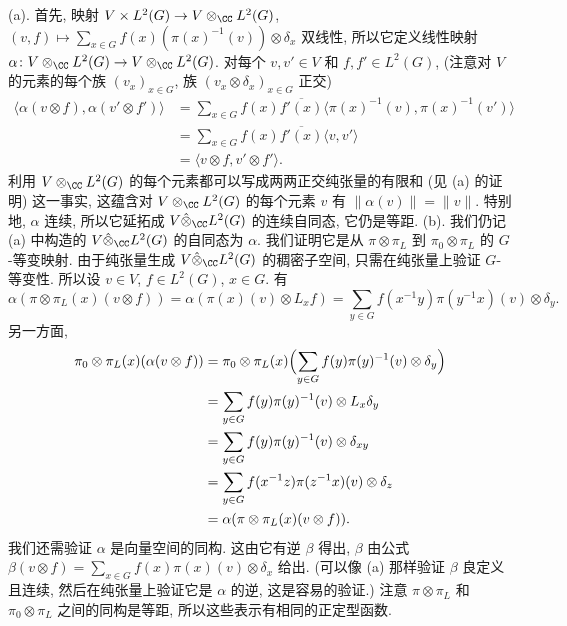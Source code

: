 \begin{solution}
(a). 首先, 映射 $V \times L^2(G) \to V \otimes_{\CC}L^2(G)$, $(v, f) \longmapsto \sum_{x \in G}f(x)(\pi(x)^{-1}(v)) \otimes \delta_x$ 双线性, 所以它定义线性映射 $\alpha \colon V \otimes_{\CC}L^2(G) \to V \otimes_{\CC}L^2(G)$. 对每个 $v, v' \in V$ 和 $f, f' \in L^2(G)$, (注意对 $V$ 的元素的每个族 $(v_x)_{x \in G}$, 族 $(v_x \otimes \delta_x)_{x \in G}$ 正交)
\begin{align*}
\langle \alpha(v \otimes f), \alpha(v' \otimes f') \rangle &= \sum_{x \in G}f(x)\overline{f'(x)}\langle \pi(x)^{-1}(v), \pi(x)^{-1}(v') \rangle \\
&= \sum_{x \in G}f(x)\overline{f'(x)}\langle v, v' \rangle \\
&= \langle v \otimes f, v' \otimes f' \rangle.
\end{align*}
利用 $V \otimes_{\CC}L^2(G)$ 的每个元素都可以写成两两正交纯张量的有限和 (见 (a) 的证明) 这一事实, 这蕴含对 $V \otimes_{\CC}L^2(G)$ 的每个元素 $v$ 有 $\|\alpha(v)\| = \|v\|$. 特别地, $\alpha$ 连续, 所以它延拓成 $V \hat{\otimes}_{\CC}L^2(G)$ 的连续自同态, 它仍是等距.
(b). 我们仍记 (a) 中构造的 $V \hat{\otimes}_{\CC}L^2(G)$ 的自同态为 $\alpha$. 我们证明它是从 $\pi \otimes \pi_L$ 到 $\pi_0 \otimes \pi_L$ 的 $G$-等变映射. 由于纯张量生成 $V \hat{\otimes}_{\CC}L^2(G)$ 的稠密子空间, 只需在纯张量上验证 $G$-等变性. 所以设 $v \in V$, $f \in L^2(G)$, $x \in G$. 有
\[
\alpha(\pi \otimes \pi_L(x)(v \otimes f)) = \alpha(\pi(x)(v) \otimes L_xf) = \sum_{y \in G}f(x^{-1}y)\pi(y^{-1}x)(v) \otimes \delta_y.
\]
另一方面,
\begin{align*}
\pi_0 \otimes \pi_L(x)(\alpha(v \otimes f)) &= \pi_0 \otimes \pi_L(x)\Bigl(\sum_{y \in G}f(y)\pi(y)^{-1}(v) \otimes \delta_y\Bigr) \\
&= \sum_{y \in G}f(y)\pi(y)^{-1}(v) \otimes L_x\delta_y \\
&= \sum_{y \in G}f(y)\pi(y)^{-1}(v) \otimes \delta_{xy} \\
&= \sum_{y \in G}f(x^{-1}z)\pi(z^{-1}x)(v) \otimes \delta_z \\
&= \alpha(\pi \otimes \pi_L(x)(v \otimes f)).
\end{align*}
我们还需验证 $\alpha$ 是向量空间的同构. 这由它有逆 $\beta$ 得出, $\beta$ 由公式 $\beta(v \otimes f) = \sum_{x \in G}f(x)\pi(x)(v) \otimes \delta_x$ 给出. (可以像 (a) 那样验证 $\beta$ 良定义且连续, 然后在纯张量上验证它是 $\alpha$ 的逆, 这是容易的验证.)
注意 $\pi \otimes \pi_L$ 和 $\pi_0 \otimes \pi_L$ 之间的同构是等距, 所以这些表示有相同的正定型函数.
\end{solution}

